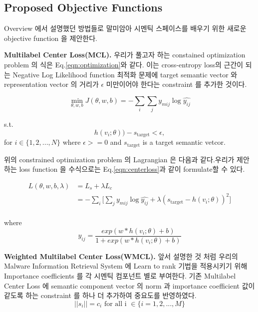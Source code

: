 





\subsection{Proposed Objective Functions}
Overview 에서 설명했던 방법들로 말미암아 시멘틱 스페이스를 배우기 위한 새로운 objective function 을 제안한다.  

\textbf{Multilabel Center Loss(MCL). }
우리가 풀고자 하는 constained optimization problem 의 식은 Eq.\ref{eqn:optimization}와 같다. 이는 cross-entropy loss의 근간이 되는 Negative Log Likelihood function 최적화 문제에 target semantic vector 와 representation vector 의 거리가 $\epsilon$ 미만이어야 한다는 constraint 를 추가한 것이다. 

\begin{equation}
\label{eqn:optimization}
\min_{\theta, w, b} J(\theta, w, b) = -\sum_i{ \sum_j{ y_{mij} \log{\hat{y_{ij}}}}}
\end{equation}

s.t.
\[
h(v_i;\theta)) - s_\text{target} < \epsilon ,
\]
for $i \in \{1,2, ..., N\}$ where $\epsilon >= 0$ and $s_\text{target}$ is a target semantic vetcor.

위의 constrained optimization problem 의 Lagrangian 은 다음과 같다.우리가 제안하는 loss function 을 수식으로는 Eq.\ref{eqn:centerloss}과 같이 formulate할 수 있다. 

\begin{equation}
\label{eqn:centerloss}
\begin{aligned}
L(\theta, w, b, \lambda) &= L_s + \lambda L_c \\
 &= -\sum_i{[ \sum_j{ y_{mij} \log{\hat{y_{ij}}}}} 
+ \lambda  (s_{\text{target}} - h(v_i;\theta))^2]\\
\end{aligned}
\end{equation}

where 
\[
\hat{y_{ij}} = \frac{exp(w*h(v_i;\theta)+b)}{ 1 + exp(w*h(v_i;\theta)+b)}
\]



  
\textbf{Weighted Multilabel Center Loss(WMCL). }
앞서 설명한 것 처럼 우리의 Malware Information Retrieval System 에 Learn to rank 기법을 적용시키기 위해 Importance coefficients 를 각 시멘틱 컴포넌트 별로 부여한다. 기존 Multilabel Center Loss 에 semantic component vector 의 norm 과 importance coefficient 값이 같도록 하는 constraint 를 하나 더 추가하여 중요도를 반영하였다.
\[
||s_i|| = c_i \text{ for all i }\in \{i = 1,2, ..., M\}
\]

